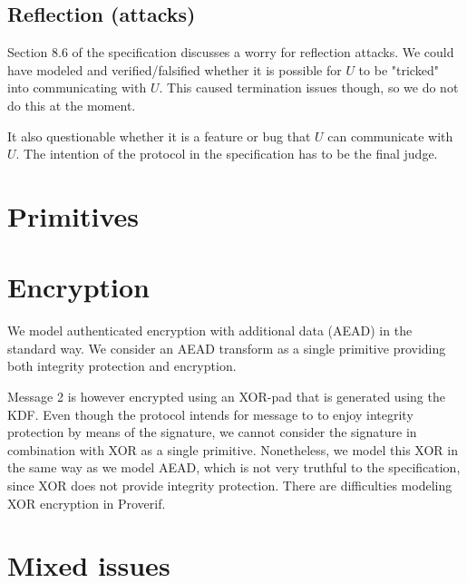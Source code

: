 \documentclass[a4paper,11pt]{article}
\theoremstyle{plain}
\theoremstyle{plain}
\begin{document}
\subsection{Reflection (attacks)}
Section 8.6 of the specification discusses a worry for reflection attacks.
%
We could have modeled and verified/falsified whether it is possible for
$U$ to be "tricked" into communicating with $U$.
%
This caused termination issues though, so we do not do this at the moment.
%

It also questionable whether it is a feature or bug that $U$ can communicate
with $U$.
%
The intention of the protocol in the specification has to be the final judge.
%

\section{Primitives}
\section{Encryption}
%
We model authenticated encryption with additional data (AEAD) in the standard
way.
%
We consider an AEAD transform as a single primitive providing both integrity
protection and encryption.
%

Message 2 is however encrypted using an XOR-pad that is generated using the KDF.
%
Even though the protocol intends for message to to enjoy integrity protection by
means of the signature, we cannot consider the signature in combination with
XOR as a single primitive.
%
Nonetheless, we model this XOR in the same way as we model AEAD, which is not very truthful
to the specification, since XOR does not provide integrity protection.
%
There are difficulties modeling XOR encryption in Proverif.
%
\section{Mixed issues}
%
\end{document}
